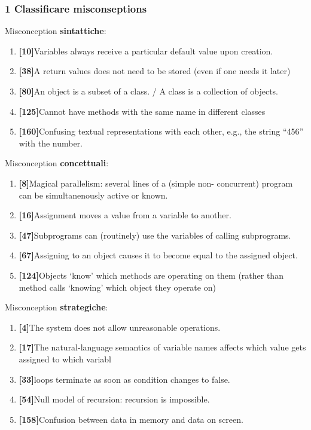 \documentclass[a4paper]{article}
\begin{document}
\subsubsection{1 Classificare misconseptions}
Misconception \textbf{sintattiche}:
\begin{enumerate}
	\item \textbf{[10]}Variables always receive a particular default value upon creation.
	\item \textbf{[38]}A return values does not need to be stored (even if one needs it later)
	\item \textbf{[80]}An object is a subset of a class. / A class is a collection of objects.
	\item \textbf{[125]}Cannot have methods with the same name in different classes
	\item \textbf{[160]}Confusing textual representations with each other, e.g., the string “456” with the number.

\end{enumerate}
Misconception \textbf{concettuali}:
\begin{enumerate}
	\item \textbf{[8]}Magical parallelism: several lines of a (simple non- concurrent) program can be simultanenously active or known.
	\item \textbf{[16]}Assignment moves a value from a variable to another.
	\item \textbf{[47]}Subprograms can (routinely) use the variables of calling subprograms.
	\item \textbf{[67]}Assigning to an object causes it to become equal to the assigned object.
	\item \textbf{[124]}Objects ‘know’ which methods are operating on them (rather than method calls ‘knowing’ which object they operate on)
\end{enumerate}
Misconception \textbf{strategiche}:
\begin{enumerate}
	\item \textbf{[4]}The system does not allow unreasonable operations.
	\item \textbf{[17]}The natural-language semantics of variable names affects which value gets assigned to which variabl
	\item \textbf{[33]}loops terminate as soon as condition changes to false.
	\item \textbf{[54]}Null model of recursion: recursion is impossible.
	\item \textbf{[158]}Confusion between data in memory and data on screen.
\end{enumerate}
\end{document}
